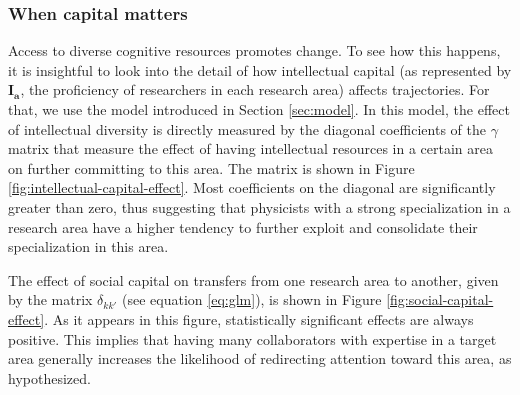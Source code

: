 \documentclass{article}
\begin{document}
\subsubsection{When capital matters}

Access to diverse cognitive resources promotes change. To see how this happens, it is insightful to look into the detail of how intellectual capital (as represented by $\bm{I_a}$, the proficiency of researchers in each research area) affects trajectories. For that, we use the model introduced in Section \ref{sec:model}. In this model, the effect of intellectual diversity is directly measured by the diagonal coefficients of the $\gamma$ matrix that measure the effect of having intellectual resources in a certain area on further committing to this area. The matrix is shown in Figure \ref{fig:intellectual-capital-effect}. Most coefficients on the diagonal are significantly greater than zero, thus suggesting that physicists with a strong specialization in a research area have a higher tendency to further exploit and consolidate their specialization in this area. %

The effect of social capital on transfers from one research area to another, given by the matrix $\delta_{kk'}$ (see equation \ref{eq:glm}), is shown in Figure \ref{fig:social-capital-effect}. As it appears in this figure, statistically significant effects are always positive. This implies that having many collaborators with expertise in a target area generally increases the likelihood of redirecting attention toward this area, as hypothesized. 
\end{document}

